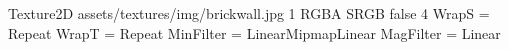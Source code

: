 Texture2D
assets/textures/img/brickwall.jpg
1
RGBA
SRGB
false
4
WrapS = Repeat
WrapT = Repeat
MinFilter = LinearMipmapLinear
MagFilter = Linear
